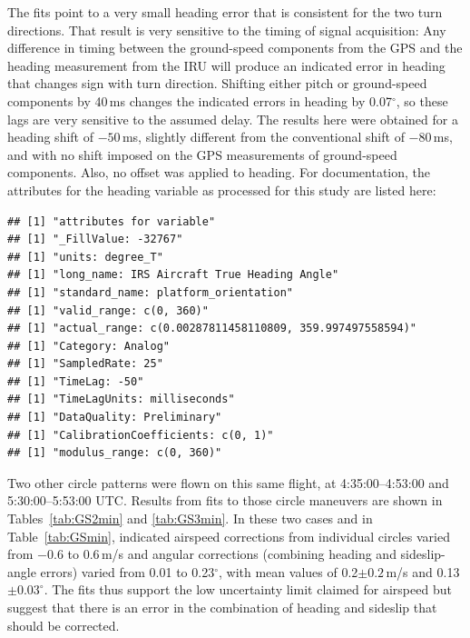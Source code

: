 \documentclass[12pt,twoside,english]{article}\usepackage[]{graphicx}\usepackage[]{color}
\makeatletter
\newenvironment{kframe}{%
 \def\at@end@of@kframe{}%
 \ifinner\ifhmode%
  \def\at@end@of@kframe{\end{minipage}}%
  \begin{minipage}{\columnwidth}%
 \fi\fi%
 \def\FrameCommand##1{\hskip\@totalleftmargin \hskip-\fboxsep
 \colorbox{shadecolor}{##1}\hskip-\fboxsep
     \hskip-\linewidth \hskip-\@totalleftmargin \hskip\columnwidth}%
 \MakeFramed {\advance\hsize-\width
   \@totalleftmargin\z@ \linewidth\hsize
   \@setminipage}}%
 {\par\unskip\endMakeFramed%
 \at@end@of@kframe}
\newenvironment{knitrout}{}{} %
\let\OrgIndex\index
\renewcommand*{\index}[1]{\OrgIndex{#1}}
\makeatother
\begin{document}
The fits point to a very small heading error that is consistent for the two turn directions. That result is very sensitive to the timing of signal acquisition: Any difference in timing between the ground-speed components from the GPS and the heading measurement from the IRU will produce an indicated error in heading that changes sign with turn direction. Shifting either pitch or ground-speed components by 40\,ms changes the indicated errors in heading by 0.07$^{\circ}$, so these lags are very sensitive to the assumed delay. The results here were obtained for a heading shift of $-50$\,ms, slightly different from the conventional shift of $-80$\,ms, and with no shift imposed on the GPS measurements of ground-speed components. Also, no offset was applied to heading. For documentation, the attributes for the heading variable as processed for this study are listed here: 

\begin{knitrout}\footnotesize
{}\color{fgcolor}\begin{kframe}
\begin{verbatim}
## [1] "attributes for variable"
## [1] "_FillValue: -32767"
## [1] "units: degree_T"
## [1] "long_name: IRS Aircraft True Heading Angle"
## [1] "standard_name: platform_orientation"
## [1] "valid_range: c(0, 360)"
## [1] "actual_range: c(0.00287811458110809, 359.997497558594)"
## [1] "Category: Analog"
## [1] "SampledRate: 25"
## [1] "TimeLag: -50"
## [1] "TimeLagUnits: milliseconds"
## [1] "DataQuality: Preliminary"
## [1] "CalibrationCoefficients: c(0, 1)"
## [1] "modulus_range: c(0, 360)"
\end{verbatim}
\end{kframe}
\end{knitrout}

Two other circle patterns were flown on this same flight, at 4:35:00--4:53:00 and 5:30:00--5:53:00 UTC. Results from fits to those circle maneuvers are shown in Tables~\ref{tab:GS2min} and \ref{tab:GS3min}. In these two cases and in Table~\ref{tab:GSmin}, indicated airspeed corrections from individual circles varied from $-0.6$ to 0.6\,m/s and angular corrections (combining heading and sideslip-angle errors) varied from 0.01 to 0.23$^{\circ}$, with mean values of 0.2$\pm0.2$\,m/s and 0.13$\pm0.03^{\circ}$. 
The fits thus support the low uncertainty limit claimed for airspeed but suggest that there is an error in the combination of heading and sideslip that should be corrected.
\end{document}
